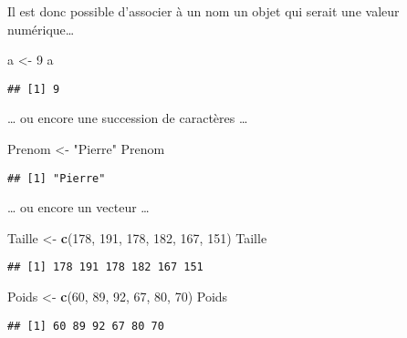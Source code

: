\documentclass[
  french,
]{book}
\newenvironment{Shaded}{\begin{snugshade}}{\end{snugshade}}
\newcommand{\DecValTok}[1]{\textcolor[rgb]{0.00,0.00,0.81}{#1}}
\newcommand{\KeywordTok}[1]{\textcolor[rgb]{0.13,0.29,0.53}{\textbf{#1}}}
\newcommand{\NormalTok}[1]{#1}
\newcommand{\StringTok}[1]{\textcolor[rgb]{0.31,0.60,0.02}{#1}}
\begin{document}
Il est donc possible d'associer à un nom un objet qui serait une valeur numérique\ldots{}

\begin{Shaded}
\begin{Highlighting}[]
\NormalTok{a <-}\StringTok{ }\DecValTok{9}
\NormalTok{a}
\end{Highlighting}
\end{Shaded}

\begin{verbatim}
## [1] 9
\end{verbatim}

\ldots{} ou encore une succession de caractères \ldots{}

\begin{Shaded}
\begin{Highlighting}[]
\NormalTok{Prenom <-}\StringTok{ "Pierre"}
\NormalTok{Prenom}
\end{Highlighting}
\end{Shaded}

\begin{verbatim}
## [1] "Pierre"
\end{verbatim}

\ldots{} ou encore un vecteur \ldots{}

\begin{Shaded}
\begin{Highlighting}[]
\NormalTok{Taille <-}\StringTok{ }\KeywordTok{c}\NormalTok{(}\DecValTok{178}\NormalTok{, }\DecValTok{191}\NormalTok{, }\DecValTok{178}\NormalTok{, }\DecValTok{182}\NormalTok{, }\DecValTok{167}\NormalTok{, }\DecValTok{151}\NormalTok{)}
\NormalTok{Taille}
\end{Highlighting}
\end{Shaded}

\begin{verbatim}
## [1] 178 191 178 182 167 151
\end{verbatim}

\begin{Shaded}
\begin{Highlighting}[]
\NormalTok{Poids <-}\StringTok{ }\KeywordTok{c}\NormalTok{(}\DecValTok{60}\NormalTok{, }\DecValTok{89}\NormalTok{, }\DecValTok{92}\NormalTok{, }\DecValTok{67}\NormalTok{, }\DecValTok{80}\NormalTok{, }\DecValTok{70}\NormalTok{)}
\NormalTok{Poids}
\end{Highlighting}
\end{Shaded}

\begin{verbatim}
## [1] 60 89 92 67 80 70
\end{verbatim}
\end{document}
